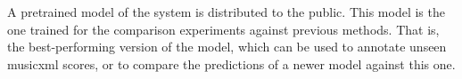 
A pretrained model of the system is distributed to the
public. This model is the one trained for the comparison
experiments against previous methods. That is, the
best-performing version of the model, which can be used to
annotate unseen \gls{musicxml} scores, or to compare the
predictions of a newer model against this one.
